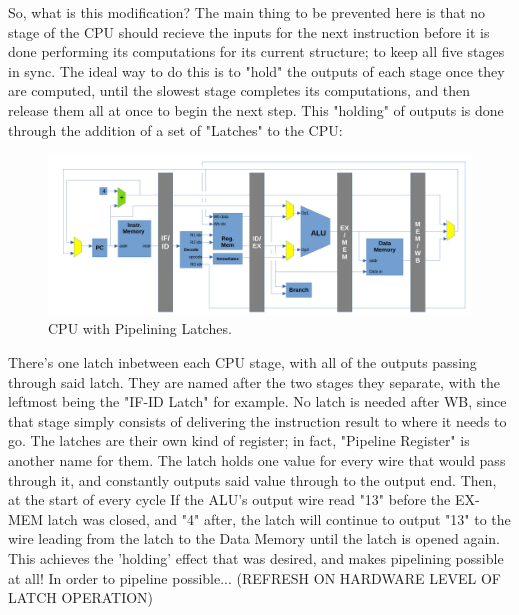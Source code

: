 \documentclass[12pt,twoside]{reedthesis}
\begin{document}
So, what is this modification? The main thing to be prevented here is that no stage of the CPU should recieve the inputs for the next instruction before it is done performing its computations for its current structure; to keep all five stages in sync. The ideal way to do this is to "hold" the outputs of each stage once they are computed, until the slowest stage completes its computations, and then release them all at once to begin the next step. This "holding" of outputs is done through the addition of a set of "Latches" to the CPU:

\begin{figure}[h!]

	\centering
	\includegraphics[scale=0.4]{cpu_latches}
	\caption{CPU with Pipelining Latches.}
	\label{cpu-latches}
\end{figure}

There's one latch inbetween each CPU stage, with all of the outputs passing through said latch. They are named after the two stages they separate, with the leftmost being the "IF-ID Latch" for example. No latch is needed after WB, since that stage simply consists of delivering the instruction result to where it needs to go.
The latches are their own kind of register; in fact, "Pipeline Register" is another name for them. The latch holds one value for every wire that would pass through it, and constantly outputs said value through to the output end. Then, at the start of every cycle If the ALU's output wire read "13" before the EX-MEM latch was closed, and "4" after, the latch will continue to output "13" to the wire leading from the latch to the Data Memory until the latch is opened again. This achieves the 'holding' effect that was desired, and makes pipelining possible at all! In order to pipeline possible... (REFRESH ON HARDWARE LEVEL OF LATCH OPERATION)
\end{document}
